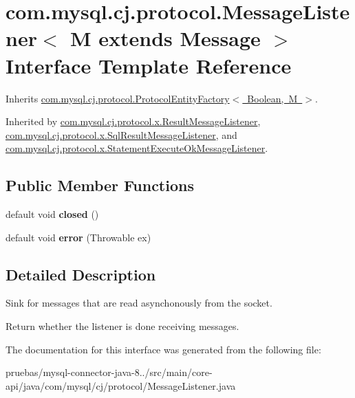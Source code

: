 \hypertarget{interfacecom_1_1mysql_1_1cj_1_1protocol_1_1_message_listener}{}\section{com.\+mysql.\+cj.\+protocol.\+Message\+Listener$<$ M extends Message $>$ Interface Template Reference}
\label{interfacecom_1_1mysql_1_1cj_1_1protocol_1_1_message_listener}


Inherits \mbox{\hyperlink{interfacecom_1_1mysql_1_1cj_1_1protocol_1_1_protocol_entity_factory}{com.\+mysql.\+cj.\+protocol.\+Protocol\+Entity\+Factory$<$ Boolean, M $>$}}.



Inherited by \mbox{\hyperlink{classcom_1_1mysql_1_1cj_1_1protocol_1_1x_1_1_result_message_listener}{com.\+mysql.\+cj.\+protocol.\+x.\+Result\+Message\+Listener}}, \mbox{\hyperlink{classcom_1_1mysql_1_1cj_1_1protocol_1_1x_1_1_sql_result_message_listener}{com.\+mysql.\+cj.\+protocol.\+x.\+Sql\+Result\+Message\+Listener}}, and \mbox{\hyperlink{classcom_1_1mysql_1_1cj_1_1protocol_1_1x_1_1_statement_execute_ok_message_listener}{com.\+mysql.\+cj.\+protocol.\+x.\+Statement\+Execute\+Ok\+Message\+Listener}}.

\subsection*{Public Member Functions}
\begin{DoxyCompactItemize}
\item 
\mbox{\label{interfacecom_1_1mysql_1_1cj_1_1protocol_1_1_message_listener_a7bc6393234bbbfa7609efc6fb7ff8c0b}} 
default void {\bfseries closed} ()
\item 
\mbox{\label{interfacecom_1_1mysql_1_1cj_1_1protocol_1_1_message_listener_a9e06f02beaf29eb065149ac4f819761f}} 
default void {\bfseries error} (Throwable ex)
\end{DoxyCompactItemize}


\subsection{Detailed Description}
Sink for messages that are read asynchonously from the socket.

Return whether the listener is done receiving messages. 

The documentation for this interface was generated from the following file\+:\begin{DoxyCompactItemize}
\item 
pruebas/mysql-\/connector-\/java-\/8../src/main/core-\/api/java/com/mysql/cj/protocol/Message\+Listener.\+java\end{DoxyCompactItemize}
